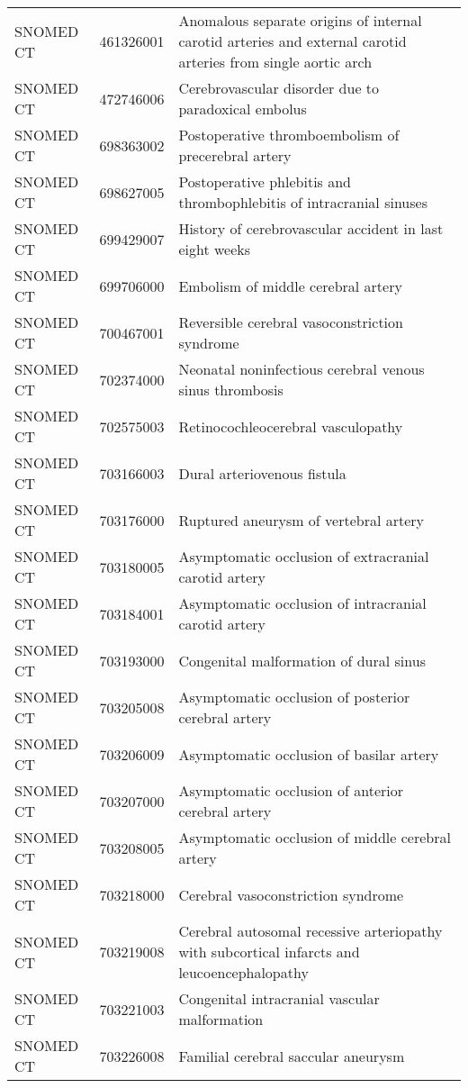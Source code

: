 \begin{longtable}{p{}p{}p{}}
  SNOMED CT & 461326001 & Anomalous separate origins of internal carotid arteries and external carotid arteries from single aortic arch \\ 
  SNOMED CT & 472746006 & Cerebrovascular disorder due to paradoxical embolus \\ 
  SNOMED CT & 698363002 & Postoperative thromboembolism of precerebral artery \\ 
  SNOMED CT & 698627005 & Postoperative phlebitis and thrombophlebitis of intracranial sinuses \\ 
  SNOMED CT & 699429007 & History of cerebrovascular accident in last eight weeks \\ 
  SNOMED CT & 699706000 & Embolism of middle cerebral artery \\ 
  SNOMED CT & 700467001 & Reversible cerebral vasoconstriction syndrome \\ 
  SNOMED CT & 702374000 & Neonatal noninfectious cerebral venous sinus thrombosis \\ 
  SNOMED CT & 702575003 & Retinocochleocerebral vasculopathy \\ 
  SNOMED CT & 703166003 & Dural arteriovenous fistula \\ 
  SNOMED CT & 703176000 & Ruptured aneurysm of vertebral artery \\ 
  SNOMED CT & 703180005 & Asymptomatic occlusion of extracranial carotid artery \\ 
  SNOMED CT & 703184001 & Asymptomatic occlusion of intracranial carotid artery \\ 
  SNOMED CT & 703193000 & Congenital malformation of dural sinus \\ 
  SNOMED CT & 703205008 & Asymptomatic occlusion of posterior cerebral artery \\ 
  SNOMED CT & 703206009 & Asymptomatic occlusion of basilar artery \\ 
  SNOMED CT & 703207000 & Asymptomatic occlusion of anterior cerebral artery \\ 
  SNOMED CT & 703208005 & Asymptomatic occlusion of middle cerebral artery \\ 
  SNOMED CT & 703218000 & Cerebral vasoconstriction syndrome \\ 
  SNOMED CT & 703219008 & Cerebral autosomal recessive arteriopathy with subcortical infarcts and leucoencephalopathy \\ 
  SNOMED CT & 703221003 & Congenital intracranial vascular malformation \\ 
  SNOMED CT & 703226008 & Familial cerebral saccular aneurysm \\ 

\end{longtable}
